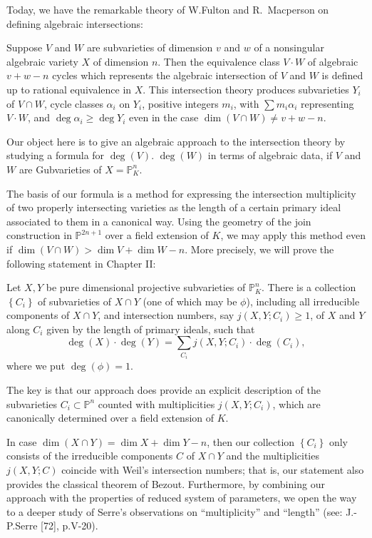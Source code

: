 Today, we have the remarkable theory of W.Fulton and R.~Mac\-person on
defining algebraic intersections: 

Suppose $V$ and $W$ are subvarieties of dimension $v$ and $w$ of a
nonsingular algebraic variety $X$ of dimension $n$. Then the
equivalence class $V \cdot W$ of algebraic $v + w -n$ cycles which
represents the algebraic intersection of $V$ and $W$ is defined up to
rational equivalence in $X$. This intersection theory produces
subvarieties $Y_i$ of $V \cap W$, cycle classes $\alpha_i$ on $Y_i$,
positive integers $m_i$, with $\sum m_i \alpha_i$ representing $V
\cdot W$,
and $\deg \alpha_i \ge \deg Y_i$ even in the case $\dim (V \cap W)
\neq v + w - n$.  

Our object here is to give an algebraic approach to the intersection
theory by studying a formula for $\deg (V)$. $\deg (W)$ in terms of
algebraic data, if $V$ and $W$ are Gubvarieties of $X =
\mathbb{P}^n_K$. 

The basis of our formula is a method for expressing the intersection
multiplicity of two properly intersecting varieties as the length of a
certain primary ideal associated to them in a canonical way. Using the
geometry of the join construction in $\mathbb{P}^{2n+1}$ over a field
extension of $K$, we may apply this method even if $\dim (V \cap W) >
\dim V + \dim W - n$. More precisely, we will prove the following
statement in Chapter II:  

Let $X, Y $ be pure dimensional projective subvarieties of
$\mathbb{P}^n_K$. There is a collection $\left\{ C_i \right\}$ of
subvarieties of  $ X \cap Y$ (one of which may be $\phi$),  including
all irreducible components of $X \cap Y$, and intersection numbers,
say $j(X, Y; C_i) \ge 1$, of $X$ and $Y$ along $C_i$ given by the
length of primary ideals, such that  
$$
\deg (X)  \cdot \deg (Y)= \sum\limits_{C_i} j(X, Y; C_i) \cdot \deg
(C_i), 
$$
where we put $\deg (\phi) = 1$.

The key is that our approach does provide an explicit description of
the subvarieties $C_i \subset \mathbb{P}^n$ counted with
multiplicities $j(X, Y; C_i)$, which are canonically determined over
a field extension of $K$. 

In case $\dim (X \cap Y) = \dim X + \dim Y - n$, then our collection
$\left\{ C_i \right\}$ only consists of the irreducible components $C$
of $X \cap Y$ and the multiplicities $j(X, Y; C)$ coincide with Weil's
intersection numbers; that is, our statement also provides the
classical theorem of Bezout. Furthermore, by combining our approach
with the properties of reduced system of parameters, we open the way
to a deeper study of Serre's observations on ``multiplicity'' and
``length'' (see:  J.-P.Serre [72], p.V-20). 

